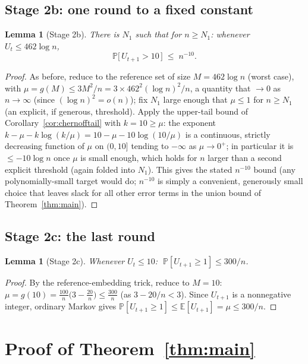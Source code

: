 \documentclass[11pt]{article}
\newtheorem{lemma}[theorem]{Lemma}
\newcommand{\E}{\mathbb{E}}
\renewcommand{\Pr}{\mathbb{P}}
\begin{document}
\subsection*{Stage 2b: one round to a fixed constant}

\begin{lemma}[Stage 2b]\label{lem:stage2b}
There is $N_1$ such that for $n \ge N_1$: whenever $U_t \le 462\log n$,
\[
  \Pr\bigl[\, U_{t+1} > 10 \,\bigr] \;\le\; n^{-10}.
\]
\end{lemma}
\begin{proof}
As before, reduce to the reference set of size $M = 462\log n$ (worst case),
with $\mu = g(M) \le 3M^2/n = 3\times 462^2 (\log n)^2/n$, a quantity that
$\to 0$ as $n\to\infty$ (since $(\log n)^2 = o(n)$); fix $N_1$ large enough
that $\mu \le 1$ for $n \ge N_1$ (an explicit, if generous, threshold).
Apply the upper-tail bound of Corollary~\ref{cor:chernofftail} with $k=10
\ge \mu$: the exponent $k-\mu-k\log(k/\mu) = 10-\mu-10\log(10/\mu)$ is a
continuous, strictly decreasing function of $\mu$ on $(0,10]$ tending to
$-\infty$ as $\mu \to 0^+$; in particular it is $\le -10\log n$ once $\mu$ is
small enough, which holds for $n$ larger than a second explicit threshold
(again folded into $N_1$). This gives the stated $n^{-10}$ bound (any
polynomially-small target would do; $n^{-10}$ is simply a convenient,
generously small choice that leaves slack for all other error terms in the
union bound of Theorem~\ref{thm:main}).
\end{proof}

\subsection*{Stage 2c: the last round}

\begin{lemma}[Stage 2c]\label{lem:stage2c}
Whenever $U_t \le 10$: $\;\Pr[U_{t+1} \ge 1] \le 300/n$.
\end{lemma}
\begin{proof}
By the reference-embedding trick, reduce to $M=10$: $\mu = g(10) =
\frac{100}n\bigl(3-\frac{20}n\bigr) \le \frac{300}n$ (as $3-20/n < 3$).
Since $U_{t+1}$ is a nonnegative integer, ordinary Markov gives $\Pr[U_{t+1}
\ge 1] \le \E[U_{t+1}] = \mu \le 300/n$.
\end{proof}

\section{Proof of Theorem~\ref{thm:main}}
\end{document}
